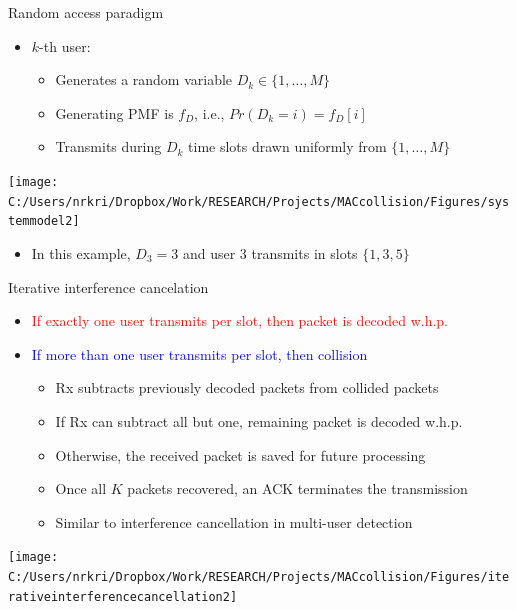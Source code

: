 \begin{frame}{Random access paradigm}
\begin{itemize}
\item $k$-th user:
\begin{itemize}
  \item Generates a random variable $D_k \in \{1,\ldots,M\}$
  \item Generating PMF is $f_D$, i.e., \alert{$Pr(D_k=i) = f_D[i]$}
  \item Transmits during $D_k$ time slots drawn uniformly from $\{1,\ldots,M\}$
\end{itemize}
\end{itemize}
\begin{center}
\texttt{[image: C:/Users/nrkri/Dropbox/Work/RESEARCH/Projects/MACcollision/Figures/systemmodel2]}
\end{center}
\vspace{-3mm}
\begin{itemize}
\item In this example, $D_3 = 3$ and user 3 transmits in slots $\{1,3,5\}$
\end{itemize}
\end{frame}
\begin{frame}{Iterative interference cancelation}
\begin{itemize}
\item \textcolor{red}{If exactly one user transmits per slot, then packet is decoded w.h.p.}
\vspace{1mm}
\item \textcolor{blue}{If more than one user transmits per slot, then collision}
    \begin{itemize}
\vspace{1mm}
    \item Rx subtracts previously decoded packets from collided packets
\vspace{1mm}
    \item If Rx can subtract all but one, remaining packet is decoded w.h.p.
\vspace{1mm}
    \item Otherwise, the received packet is saved for future processing
\vspace{1mm}
    \item Once all $K$ packets recovered, an ACK terminates the transmission
\vspace{1mm}
    \item Similar to interference cancellation in multi-user detection
    \end{itemize}
\end{itemize}
\vspace*{-0.1in}
\begin{center}
\texttt{[image: C:/Users/nrkri/Dropbox/Work/RESEARCH/Projects/MACcollision/Figures/iterativeinterferencecancellation2]}
\end{center}
\end{frame}

